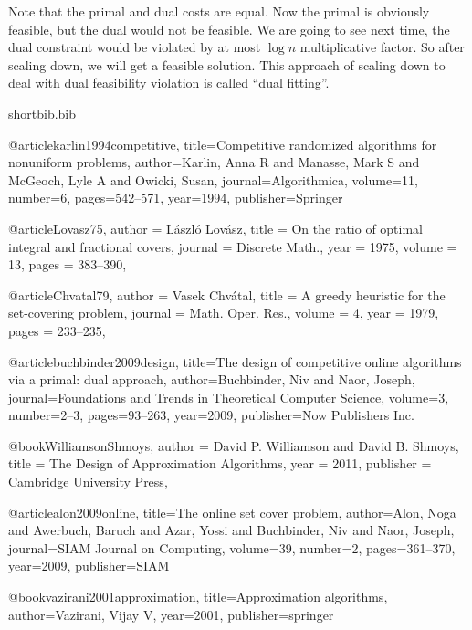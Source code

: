 \documentclass[11pt]{article}
\begin{document}
Note that the primal and dual costs are equal. Now the primal is obviously feasible, but the dual would not be feasible. We are going to see next time, the dual constraint would be violated by at most  $\log n$ multiplicative factor. So after scaling down, we will get a feasible solution. This approach of scaling down to deal with dual feasibility violation is called ``dual fitting''. 


\begin{filecontents}{shortbib.bib}

@article{karlin1994competitive,
  title={Competitive randomized algorithms for nonuniform problems},
  author={Karlin, Anna R and Manasse, Mark S and McGeoch, Lyle A and Owicki, Susan},
  journal={Algorithmica},
  volume={11},
  number={6},
  pages={542--571},
  year={1994},
  publisher={Springer}
}

@article{Lovasz75,
  author    = {L{\'{a}}szl{\'{o}} Lov{\'{a}}sz},
  title     = {On the ratio of optimal integral and fractional covers},
  journal   = {Discrete Math.},
  year      = {1975},
  volume    = {13},
  pages     = {383--390},
}

@article{Chvatal79,
  author = {Vasek Chv\'{a}tal},
  title = {A greedy heuristic for the set-covering problem},
  journal = {Math. Oper. Res.},
  volume = 4,
  year = 1979,
  pages = {233--235},
}
 
@article{buchbinder2009design,
  title={The design of competitive online algorithms via a primal: dual approach},
  author={Buchbinder, Niv and Naor, Joseph},
  journal={Foundations and Trends in Theoretical Computer Science},
  volume={3},
  number={2--3},
  pages={93--263},
  year={2009},
  publisher={Now Publishers Inc.}
}

@book{WilliamsonShmoys,
  author    = {David P. Williamson and
               David B. Shmoys},
  title     = {The Design of Approximation Algorithms},
  year      = {2011},
  publisher = {Cambridge University Press},
}
 
@article{alon2009online,
  title={The online set cover problem},
  author={Alon, Noga and Awerbuch, Baruch and Azar, Yossi and Buchbinder, Niv and Naor, Joseph},
  journal={SIAM Journal on Computing},
  volume={39},
  number={2},
  pages={361--370},
  year={2009},
  publisher={SIAM}
}

@book{vazirani2001approximation,
  title={Approximation algorithms},
  author={Vazirani, Vijay V},
  year={2001},
  publisher={springer}
}

\end{filecontents}


\end{document}
